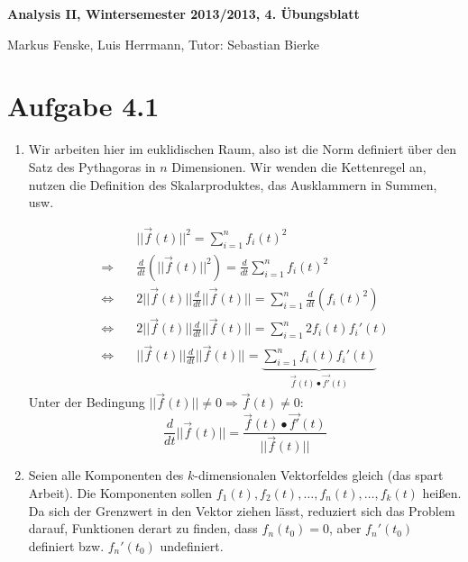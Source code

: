 \documentclass[a4paper,german,12pt,smallheadings]{scrartcl}
\begin{document}
\begin{center}
\bfseries %
\sffamily %
\vspace{-40pt}
Analysis II, Wintersemester 2013/2013, 4. Übungsblatt

Markus Fenske, Luis Herrmann, Tutor: Sebastian Bierke
\vspace{-10pt}
\end{center}

\section*{Aufgabe 4.1}
\begin{enumerate}[(1)]
  \item
    Wir arbeiten hier im euklidischen Raum, also ist die Norm definiert über den
    Satz des Pythagoras in $n$ Dimensionen. Wir wenden die Kettenregel an, nutzen
    die Definition des Skalarproduktes, das Ausklammern in Summen, usw.

    \begin{align*}
      &||\vec{f}(t)||^2 = \sum_{i=1}^{n}f_i(t)^2\\
      \Rightarrow\quad &\frac{d}{dt}\left(||\vec{f}(t)||^2\right)=\frac{d}{dt}\sum_{i=1}^{n}f_i(t)^2\\
      \Leftrightarrow \quad & 2||\vec{f}(t)||\frac{d}{dt}||\vec{f}(t)||=\sum_{i=1}^{n}\frac{d}{dt}(f_i(t)^2)\\
      \Leftrightarrow \quad & 2||\vec{f}(t)||\frac{d}{dt}||\vec{f}(t)||=\sum_{i=1}^{n}2f_i(t)f_i'(t)\\
      \Leftrightarrow \quad & ||\vec{f}(t)||\frac{d}{dt}||\vec{f}(t)||=\underbrace{\sum_{i=1}^{n}f_i(t)f_i'(t)}_{\vec{f}(t)\bullet\vec{f'}(t)}
    \end{align*}
    Unter der Bedingung $||\vec{f}(t)||\neq 0 \Rightarrow \vec{f}(t)\neq 0$:
    \begin{equation*}
    \frac{d}{dt}||\vec{f}(t)||=\frac{\vec{f}(t)\bullet\vec{f'}(t)}{||\vec{f}(t)||}
    \end{equation*}
    
  \item
    Seien alle Komponenten des $k$-dimensionalen Vektorfeldes gleich (das spart Arbeit). Die
    Komponenten sollen $f_1(t), f_2(t), \dots, f_n(t), \dots, f_k(t)$ heißen. Da sich der
    Grenzwert in den Vektor ziehen lässt, reduziert sich das Problem darauf,
    Funktionen derart zu finden, dass $f_n(t_0) = 0$, aber $f_n'(t_0)$
    definiert bzw.  $f_n'(t_0)$ undefiniert.


\end{enumerate}
\end{document}
